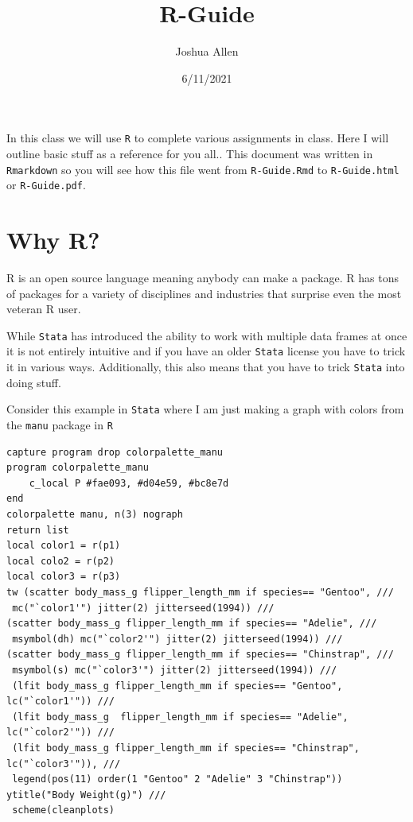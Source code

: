 \documentclass[]{tufte-handout}
\title{R-Guide}
\author{Joshua Allen}
\date{6/11/2021}
\begin{document}
\maketitle




In this class we will use \texttt{R} to complete various assignments in
class. Here I will outline basic stuff as a reference for you all.. This
document was written in \texttt{Rmarkdown} so you will see how this file
went from \texttt{R-Guide.Rmd} to \texttt{R-Guide.html} or
\texttt{R-Guide.pdf}.

\hypertarget{why-r}{%
\section{Why R?}\label{why-r}}

R is an open source language meaning anybody can make a package. R has
tons of packages for a variety of disciplines and industries that
surprise even the most veteran R user.

While \texttt{Stata} has introduced the ability to work with multiple
data frames at once it is not entirely intuitive and if you have an
older \texttt{Stata} license you have to trick it in various ways.
Additionally, this also means that you have to trick \texttt{Stata} into
doing stuff.

Consider this example in \texttt{Stata} where I am just making a graph
with colors from the \texttt{manu} package in \texttt{R}

\begin{verbatim}
capture program drop colorpalette_manu
program colorpalette_manu
    c_local P #fae093, #d04e59, #bc8e7d
end
colorpalette manu, n(3) nograph
return list
local color1 = r(p1)
local colo2 = r(p2)
local color3 = r(p3)
tw (scatter body_mass_g flipper_length_mm if species== "Gentoo", ///
 mc("`color1'") jitter(2) jitterseed(1994)) ///
(scatter body_mass_g flipper_length_mm if species== "Adelie", ///
 msymbol(dh) mc("`color2'") jitter(2) jitterseed(1994)) ///
(scatter body_mass_g flipper_length_mm if species== "Chinstrap", ///
 msymbol(s) mc("`color3'") jitter(2) jitterseed(1994)) ///
 (lfit body_mass_g flipper_length_mm if species== "Gentoo", lc("`color1'")) /// 
 (lfit body_mass_g  flipper_length_mm if species== "Adelie", lc("`color2'")) ///
 (lfit body_mass_g flipper_length_mm if species== "Chinstrap", lc("`color3'")), ///
 legend(pos(11) order(1 "Gentoo" 2 "Adelie" 3 "Chinstrap")) ytitle("Body Weight(g)") ///
 scheme(cleanplots)
 
\end{verbatim}
\end{document}
